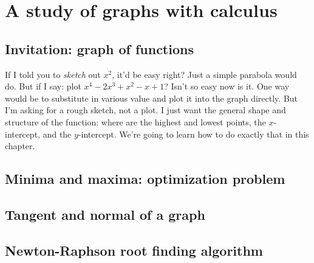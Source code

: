\chapter{A study of graphs with calculus}

\section{Invitation: graph of functions}

If I told you to \emph{sketch} out $x^2$, it'd be easy right? Just a simple parabola would do. But if I say: plot $x^4 - 2x^3 + x^2 - x + 1$? Isn't so easy now is it. One way would be to substitute in various value and plot it into the graph directly. But I'm asking for a rough sketch, not a plot. I just want the general shape and structure of the function: where are the highest and lowest points, the $x$-intercept, and the $y$-intercept. We're going to learn how to do exactly that in this chapter.

\section{Minima and maxima: optimization problem}

\section{Tangent and normal of a graph}

\section{Newton-Raphson root finding algorithm}
